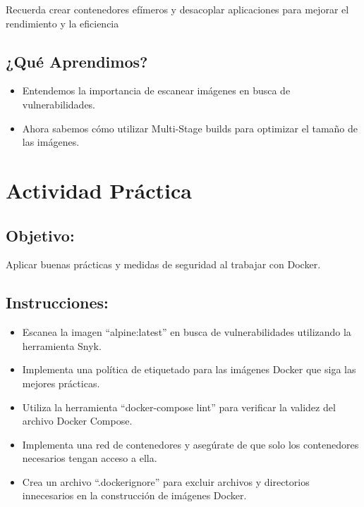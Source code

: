 \documentclass[
  a4paper,
  DIV=11,
  numbers=noendperiod,
  onepage,
  openany]{scrreprt}
\providecommand{\tightlist}{%
  \setlength{\itemsep}{0pt}\setlength{\parskip}{0pt}}\usepackage{longtable,booktabs,array}
\begin{document}
\begin{tcolorbox}[enhanced jigsaw, opacityback=0, titlerule=0mm, bottomtitle=1mm, arc=.35mm, toptitle=1mm, breakable, colframe=quarto-callout-tip-color-frame, left=2mm, leftrule=.75mm, coltitle=black, rightrule=.15mm, toprule=.15mm, colbacktitle=quarto-callout-tip-color!10!white, colback=white, bottomrule=.15mm, title=\textcolor{quarto-callout-tip-color}{\faLightbulb}\hspace{0.5em}{Tip}, opacitybacktitle=0.6]

Recuerda crear contenedores efímeros y desacoplar aplicaciones para
mejorar el rendimiento y la eficiencia

\end{tcolorbox}

\hypertarget{quuxe9-aprendimos-3}{%
\section{¿Qué Aprendimos?}\label{quuxe9-aprendimos-3}}

\begin{itemize}
\tightlist
\item
  Entendemos la importancia de escanear imágenes en busca de
  vulnerabilidades.
\item
  Ahora sabemos cómo utilizar Multi-Stage builds para optimizar el
  tamaño de las imágenes.
\end{itemize}

\hypertarget{actividad-pruxe1ctica-3}{%
\chapter{Actividad Práctica}\label{actividad-pruxe1ctica-3}}

\hypertarget{objetivo-3}{%
\section{Objetivo:}\label{objetivo-3}}

Aplicar buenas prácticas y medidas de seguridad al trabajar con Docker.

\hypertarget{instrucciones-2}{%
\section{Instrucciones:}\label{instrucciones-2}}

\begin{itemize}
\tightlist
\item
  Escanea la imagen ``alpine:latest'' en busca de vulnerabilidades
  utilizando la herramienta Snyk.
\item
  Implementa una política de etiquetado para las imágenes Docker que
  siga las mejores prácticas.
\item
  Utiliza la herramienta ``docker-compose lint'' para verificar la
  validez del archivo Docker Compose.
\item
  Implementa una red de contenedores y asegúrate de que solo los
  contenedores necesarios tengan acceso a ella.
\item
  Crea un archivo ``.dockerignore'' para excluir archivos y directorios
  innecesarios en la construcción de imágenes Docker.
\end{itemize}
\end{document}
